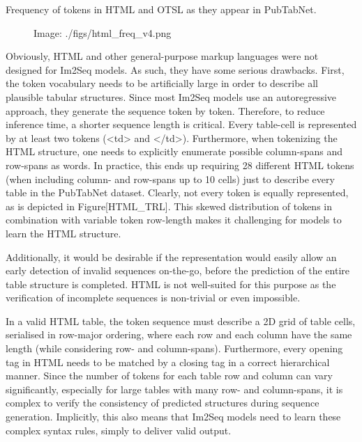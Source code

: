 \documentclass[11pt,a4paper]{article}
\begin{document}
Frequency of tokens in HTML and OTSL as they appear in PubTabNet.

\begin{figure}[h]
\caption{Image: ./figs/html\_freq\_v4.png}
\end{figure}

Obviously, HTML and other general-purpose markup languages were not designed for Im2Seq models. As such, they have some serious drawbacks. First, the token vocabulary needs to be artificially large in order to describe all plausible tabular structures. Since most Im2Seq models use an autoregressive approach, they generate the sequence token by token. Therefore, to reduce inference time, a shorter sequence length is critical.
Every table-cell is represented by at least two tokens (<td> and </td>). Furthermore, when tokenizing the HTML structure, one needs to explicitly enumerate possible column-spans and row-spans as words. In practice, this ends up requiring 28 different HTML tokens (when including column- and row-spans up to 10 cells) just to describe every table in the PubTabNet dataset. Clearly, not every token is equally represented, as is depicted in Figure[HTML\_TRL]. This skewed distribution of tokens in combination with variable token row-length makes it challenging for models to learn the HTML structure.

Additionally, it would be desirable if the representation would easily allow an early detection of invalid sequences on-the-go, before the prediction of the entire table structure is completed. HTML is not well-suited for this purpose as the verification of incomplete sequences is non-trivial or even impossible.

In a valid HTML table, the token sequence must describe a 2D grid of table cells, serialised in row-major ordering, where each row and each column have the same length (while considering row- and column-spans). Furthermore, every opening tag in HTML needs to be matched by a closing tag in a correct hierarchical manner.
Since the number of tokens for each table row and column can vary significantly, especially for large tables with many row- and column-spans, it is complex to verify the consistency of predicted structures during sequence generation. Implicitly, this also means that Im2Seq models need to learn these complex syntax rules, simply to deliver valid output.
\end{document}
